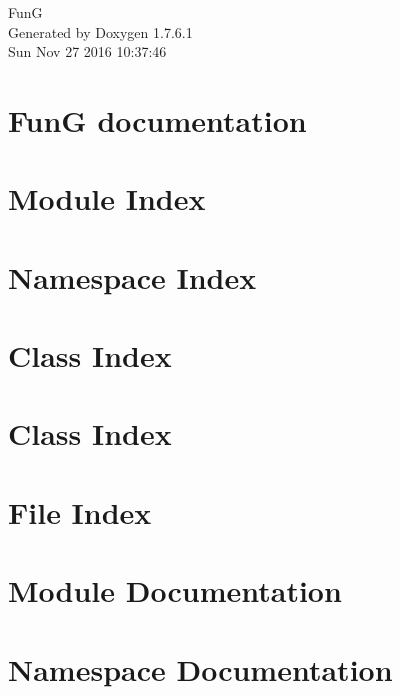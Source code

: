 \documentclass[a4paper]{book}
\begin{document}
\hypersetup{pageanchor=false,citecolor=blue}
\begin{titlepage}
\vspace*{7cm}
\begin{center}
{\Large \-Fun\-G }\\
\vspace*{1cm}
{\large \-Generated by Doxygen 1.7.6.1}\\
\vspace*{0.5cm}
{\small Sun Nov 27 2016 10:37:46}\\
\end{center}
\end{titlepage}
\clearemptydoublepage
{}
\tableofcontents
\clearemptydoublepage
{}
\hypersetup{pageanchor=true,citecolor=blue}
\chapter{\-Fun\-G documentation}
\label{index}\hypertarget{index}{}
\chapter{\-Module \-Index}

\chapter{\-Namespace \-Index}

\chapter{\-Class \-Index}

\chapter{\-Class \-Index}

\chapter{\-File \-Index}

\chapter{\-Module \-Documentation}










\chapter{\-Namespace \-Documentation}











\end{document}

